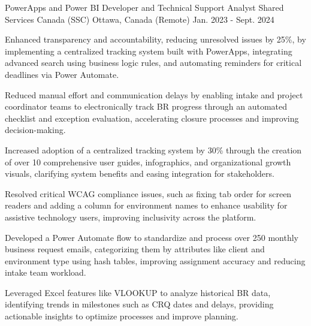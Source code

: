 
\begin{cventries}

\cventry
  {PowerApps and Power BI Developer and Technical Support Analyst} %
  {Shared Services Canada (SSC)} %
  {Ottawa, Canada (Remote)} %
  {Jan. 2023 - Sept. 2024} %
  { %
    \begin{cvitems}
      \item {Enhanced transparency and accountability, reducing unresolved issues by 25\%, by implementing a centralized tracking system built with PowerApps, integrating advanced search using business logic rules, and automating reminders for critical deadlines via Power Automate.}
      \item {Reduced manual effort and communication delays by enabling intake and project coordinator teams to electronically track BR progress through an automated checklist and exception evaluation, accelerating closure processes and improving decision-making.}
      \item {Increased adoption of a centralized tracking system by 30\% through the creation of over 10 comprehensive user guides, infographics, and organizational growth visuals, clarifying system benefits and easing integration for stakeholders.}
      \item {Resolved critical WCAG compliance issues, such as fixing tab order for screen readers and adding a column for environment names to enhance usability for assistive technology users, improving inclusivity across the platform.}
      \item {Developed a Power Automate flow to standardize and process over 250 monthly business request emails, categorizing them by attributes like client and environment type using hash tables, improving assignment accuracy and reducing intake team workload.}
      \item {Leveraged Excel features like VLOOKUP to analyze historical BR data, identifying trends in milestones such as CRQ dates and delays, providing actionable insights to optimize processes and improve planning.}

\end{cvitems}}
\end{cventries}
